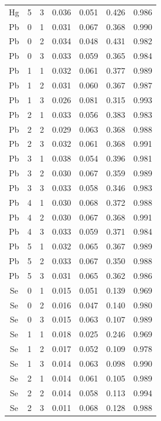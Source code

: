 \documentclass[ms, hidelinks]{uncgdissertationexp}
\theoremstyle{plain}
\theoremstyle{definition}
\theoremstyle{remark}
\begin{document}
\begin{longtable}{ccccccc}
Hg & 5 & 3 & 0.036 & 0.051 & 0.426 & 0.986\\
\rowcolor{gray!6}  Pb & 0 & 1 & 0.031 & 0.067 & 0.368 & 0.990\\
Pb & 0 & 2 & 0.034 & 0.048 & 0.431 & 0.982\\
\rowcolor{gray!6}  Pb & 0 & 3 & 0.033 & 0.059 & 0.365 & 0.984\\
Pb & 1 & 1 & 0.032 & 0.061 & 0.377 & 0.989\\
\rowcolor{gray!6}  Pb & 1 & 2 & 0.031 & 0.060 & 0.367 & 0.987\\
Pb & 1 & 3 & 0.026 & 0.081 & 0.315 & 0.993\\
\rowcolor{gray!6}  Pb & 2 & 1 & 0.033 & 0.056 & 0.383 & 0.983\\
Pb & 2 & 2 & 0.029 & 0.063 & 0.368 & 0.988\\
\rowcolor{gray!6}  Pb & 2 & 3 & 0.032 & 0.061 & 0.368 & 0.991\\
Pb & 3 & 1 & 0.038 & 0.054 & 0.396 & 0.981\\
\rowcolor{gray!6}  Pb & 3 & 2 & 0.030 & 0.067 & 0.359 & 0.989\\
Pb & 3 & 3 & 0.033 & 0.058 & 0.346 & 0.983\\
\rowcolor{gray!6}  Pb & 4 & 1 & 0.030 & 0.068 & 0.372 & 0.988\\
Pb & 4 & 2 & 0.030 & 0.067 & 0.368 & 0.991\\
\rowcolor{gray!6}  Pb & 4 & 3 & 0.033 & 0.059 & 0.371 & 0.984\\
Pb & 5 & 1 & 0.032 & 0.065 & 0.367 & 0.989\\
\rowcolor{gray!6}  Pb & 5 & 2 & 0.033 & 0.067 & 0.350 & 0.988\\
Pb & 5 & 3 & 0.031 & 0.065 & 0.362 & 0.986\\
\rowcolor{gray!6}  Se & 0 & 1 & 0.015 & 0.051 & 0.139 & 0.969\\
Se & 0 & 2 & 0.016 & 0.047 & 0.140 & 0.980\\
\rowcolor{gray!6}  Se & 0 & 3 & 0.015 & 0.063 & 0.107 & 0.989\\
Se & 1 & 1 & 0.018 & 0.025 & 0.246 & 0.969\\
\rowcolor{gray!6}  Se & 1 & 2 & 0.017 & 0.052 & 0.109 & 0.978\\
Se & 1 & 3 & 0.014 & 0.063 & 0.098 & 0.990\\
\rowcolor{gray!6}  Se & 2 & 1 & 0.014 & 0.061 & 0.105 & 0.989\\
Se & 2 & 2 & 0.014 & 0.058 & 0.113 & 0.994\\
\rowcolor{gray!6}  Se & 2 & 3 & 0.011 & 0.068 & 0.128 & 0.988\\

\end{longtable}
\end{document}
